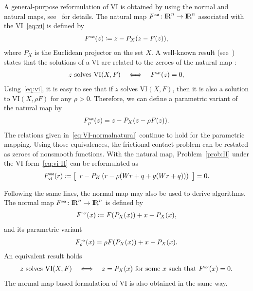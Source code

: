 {A general-purpose reformulation of VI is obtained by using the normal and natural maps, see~\cite{Facchinei.Pang2003} for details.
 The natural map $F^{\hbox{\sf \tiny{nat}}}\colon \mathrm{I\!R}^n\to\mathrm{I\!R}^n$ associated with the VI~\eqref{eq:vi} is defined by
\begin{equation}
  \label{eq:naturalmap}
  F^\nat(z) \coloneqq z - P_{X}(z-F(z)),
\end{equation}
where $P_X$ is the Euclidean projector on the set $X$. A well-known result (see~\cite{Facchinei.Pang2003}) states that the solutions of a VI are related to the zeroes of the natural map :
\begin{equation}
  \label{eq:VI-normalnatural}
  \begin{array}{c}
  z \text{ solves } \mathrm{VI}(X,F)\quad \Longleftrightarrow\quad  F^\nat(z)=0,
\end{array}
\end{equation}
Using~\eqref{eq:vi}, it is easy to see that if $z$ solves  $\mathrm{VI}(X,F)$, then it is  also a solution to $\mathrm{VI}(X,\rho F)$ for any $\rho > 0$.
Therefore, we can define a parametric variant of the natural map by
\begin{equation}
  \label{eq:parametrized-naturalnormalmap}
  \begin{array}{l}
    F_\rho^\nat(z) = z - P_{X}(z-\rho F(z)).
  \end{array}
\end{equation}
The relations given in~\eqref{eq:VI-normalnatural} continue to hold for the parametric mapping.
Using those {equivalences}, the frictional contact problem can be restated as zeroes of nonsmooth functions.
With the natural map, Problem~\ref{prob:II} under the VI form~\eqref{eq:vi-II} can be reformulated as
\begin{equation}
  \label{eq:natural-II}
  F_\vitwo^\nat(r) \coloneqq   \left[
  \begin{array}{l} 
    r - P_{K}\left(r  - \rho (W r +q + g(W r +q))\right) 
  \end{array}\right] 
  = 0.
\end{equation}


  Following the same lines, the normal map may also be used to derive algorithms. The normal map $F^{\hbox{\sf \tiny{nor}}}\colon \mathrm{I\!R}^n\to\mathrm{I\!R}^n$ is defined by
\begin{equation}
  \label{eq:normalmap}
  F^\nor(x) \coloneqq F(P_X(x)) + x - P_{X}(x),
\end{equation}
and its parametric variant
\begin{equation}
  \label{eq:normalmap-b}
 F_\rho^\nor(x) = \rho F(P_X(x)) + x - P_{X}(x).
\end{equation}
An equivalent result holds
 \begin{equation}
  \label{eq:VI-normalmap}
  \begin{array}{c}
  z \text{ solves } \mathrm{VI}(X,F)\quad \Longleftrightarrow \quad z = P_X(x) \text{ for some } x \text{ such that } F^\nor(x)=0.
\end{array}
\end{equation}
The normal map based formulation of VI is also obtained in the same way. 



}
